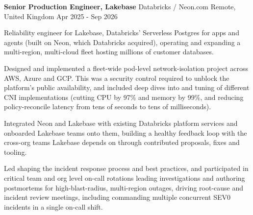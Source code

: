 
\begin{cventries}

	\cventry
	{\textbf{Senior Production Engineer, Lakebase}} %
	{Databricks / Neon.com} %
	{Remote, United Kingdom} %
	{Apr 2025 - Sep 2026} %
	{
		\begin{cvitems} %
			\item {
			            Reliability engineer for Lakebase, Databricks' Serverless Postgres for
			            apps and agents (built on Neon, which Databricks acquired),
			            operating and expanding a multi-region, multi-cloud fleet hosting
			            millions of customer databases.
			      }
			\item {
			            Designed and implemented a fleet-wide pod-level network-isolation
			            project across AWS, Azure and GCP. This was a security control required
			            to unblock the platform's public availability, and included deep dives
			            into and tuning of different CNI implementations (cutting CPU by 97\%
			            and memory by 99\%, and reducing policy-reconcile latency from tens of
			            seconds to tens of milliseconds).
			      }
			\item {
			            Integrated Neon and Lakebase with existing Databricks platform
			            services and onboarded Lakebase teams onto them,
			            building a healthy feedback loop with the cross-org teams
			            Lakebase depends on through contributed proposals, fixes and tooling.
			      }
			\item {
			            Led shaping the incident response process and best practices, and
			            participated in critical team and org level on-call rotations leading
			            investigations and authoring postmortems for high-blast-radius,
			            multi-region outages, driving root-cause and incident review meetings,
			            including commanding multiple concurrent SEV0 incidents in a single
			            on-call shift.
			      }
			\item {
}
\end{cvitems}}
\end{cventries}
